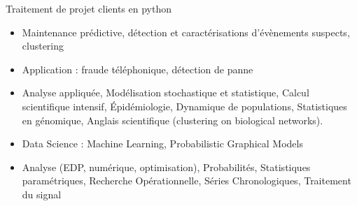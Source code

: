 \documentclass[10pt,a4paper]{altacv}
\begin{document}
{}
Traitement de projet clients en python
\smallskip
\begin{itemize}
\item Maintenance prédictive, détection et caractérisations d'évènements suspects, clustering
\item Application : fraude téléphonique, détection de panne
\end{itemize}


\begin{itemize}
\item %
    Analyse appliquée, 
    Modélisation stochastique et statistique, 
    Calcul scientifique intensif,
    \'Epidémiologie, 
    Dynamique de populations,
    Statistiques en génomique,
    Anglais scientifique (clustering on biological networks).
\item Data Science : Machine Learning, Probabilistic Graphical Models
\end{itemize}

\smallskip
{}
\begin{itemize}
\item %
    Analyse (EDP, numérique, optimisation), Probabilités, Statistiques paramétriques, Recherche Opérationnelle, Séries Chronologiques, Traitement du signal
\end{itemize}

\smallskip


\end{document}
